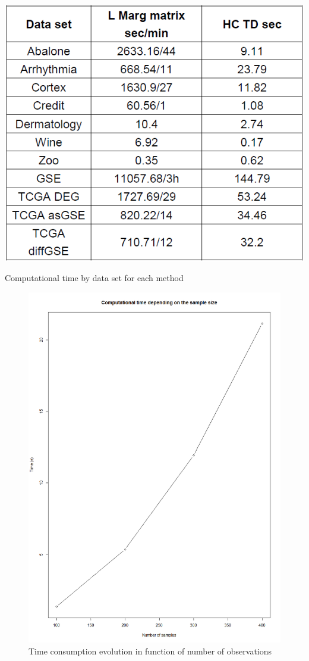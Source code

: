 \documentclass[twocolumn]{article}
\begin{document}
\begin{table}[!]
    \centering
    \includegraphics[scale=0.4]{img/runTime.png}
    \caption{Computational time by data set for each method}
    \label{tab:runTime}
\end{table}
\begin{figure}[!]
    \centering
    \includegraphics[scale=0.3]{img/ObsTime.png}
    \caption{Time consumption evolution in function of number of observations}
    \label{fig:tpsObs}
\end{figure}
\end{document}
